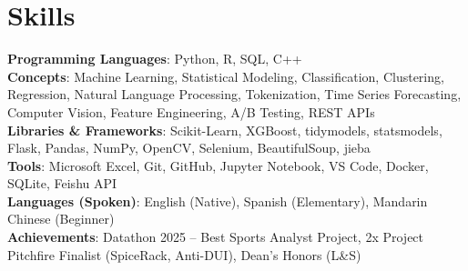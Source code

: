 \documentclass[letterpaper,10pt]{article}
\begin{document}
\section{Skills}
 \begin{itemize}[leftmargin=0.15in, label={}]
    \small{\item{
     \textbf{Programming Languages}{: Python, R, SQL, C++} \\
     \textbf{Concepts}{: Machine Learning, Statistical Modeling, Classification, Clustering, Regression, Natural Language Processing, Tokenization, Time Series Forecasting, Computer Vision, Feature Engineering, A/B Testing, REST APIs} \\
     \textbf{Libraries \& Frameworks}{: Scikit-Learn, XGBoost, tidymodels, statsmodels, Flask, Pandas, NumPy, OpenCV, Selenium, BeautifulSoup, jieba} \\
     \textbf{Tools}{: Microsoft Excel, Git, GitHub, Jupyter Notebook, VS Code, Docker, SQLite, Feishu API} \\
     \textbf{Languages (Spoken)}{: English (Native), Spanish (Elementary), Mandarin Chinese (Beginner)} \\
     \textbf{Achievements}{: Datathon 2025 -- Best Sports Analyst Project, 2x Project Pitchfire Finalist (SpiceRack, Anti-DUI), Dean's Honors (L&S)}
    }}
 \end{itemize}
 
\end{document}
